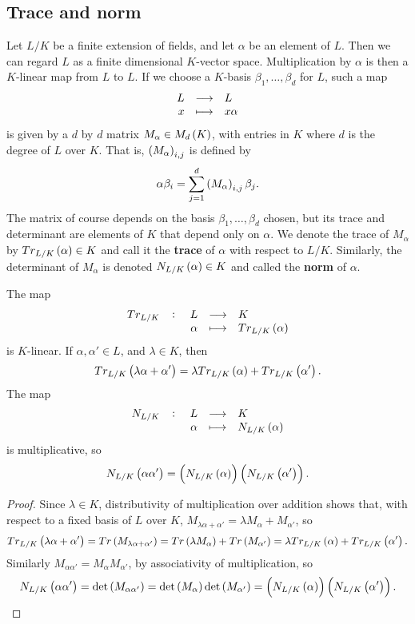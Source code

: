 \subsection{Trace and norm}

Let $ L / K $ be a finite extension of fields, and let $ \alpha $ be an element of $ L $. Then we can regard $ L $ as a finite dimensional $ K $-vector space. Multiplication by $ \alpha $ is then a $ K $-linear map from $ L $ to $ L $. If we choose a $ K $-basis $ \beta_1, \dots, \beta_d $ for $ L $, such a map
$$ \function{L}{L}{x}{x\alpha} $$
is given by a $ d $ by $ d $ matrix $ M_\alpha \in M_d\br{K} $, with entries in $ K $ where $ d $ is the degree of $ L $ over $ K $. That is, $ \br{M_\alpha}_{i, j} $ is defined by
$$ \alpha\beta_i = \sum_{j = 1}^d \br{M_\alpha}_{i, j}\beta_j. $$
The matrix of course depends on the basis $ \beta_1, \dots, \beta_d $ chosen, but its trace and determinant are elements of $ K $ that depend only on $ \alpha $. We denote the trace of $ M_\alpha $ by $ Tr_{L / K}\br{\alpha} \in K $ and call it the \textbf{trace} of $ \alpha $ with respect to $ L / K $. Similarly, the determinant of $ M_\alpha $ is denoted $ N_{L / K}\br{\alpha} \in K $ and called the \textbf{norm} of $ \alpha $.

\begin{lemma}
The map
$$ \function[Tr_{L / K}]{L}{K}{\alpha}{Tr_{L / K}\br{\alpha}} $$
is $ K $-linear. If $ \alpha, \alpha' \in L $, and $ \lambda \in K $, then
$$ Tr_{L / K}\br{\lambda\alpha + \alpha'} = \lambda Tr_{L / K}\br{\alpha} + Tr_{L / K}\br{\alpha'}. $$
The map
$$ \function[N_{L / K}]{L}{K}{\alpha}{N_{L / K}\br{\alpha}} $$
is multiplicative, so
$$ N_{L / K}\br{\alpha\alpha'} = \br{N_{L / K}\br{\alpha}}\br{N_{L / K}\br{\alpha'}}. $$
\end{lemma}

\begin{proof}
Since $ \lambda \in K $, distributivity of multiplication over addition shows that, with respect to a fixed basis of $ L $ over $ K $, $ M_{\lambda\alpha + \alpha'} = \lambda M_\alpha + M_{\alpha'} $, so
$$ Tr_{L / K}\br{\lambda\alpha + \alpha'} = Tr\br{M_{\lambda\alpha + \alpha'}} = Tr\br{\lambda M_\alpha} + Tr\br{M_{\alpha'}} = \lambda Tr_{L / K}\br{\alpha} + Tr_{L / K}\br{\alpha'}. $$
Similarly $ M_{\alpha\alpha'} = M_\alpha M_{\alpha'} $, by associativity of multiplication, so
$$ N_{L / K}\br{\alpha\alpha'} = \det\br{M_{\alpha\alpha'}} = \det\br{M_\alpha}\det\br{M_{\alpha'}} = \br{N_{L / K}\br{\alpha}}\br{N_{L / K}\br{\alpha'}}. $$
\end{proof}


